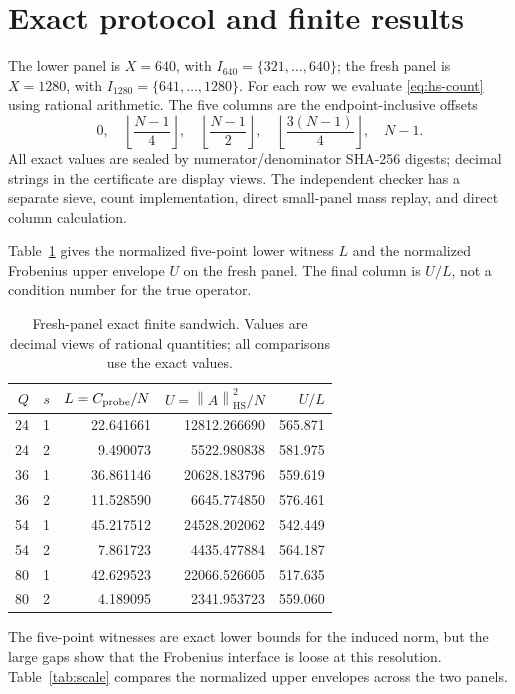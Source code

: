 \documentclass[10pt,a4paper]{article}
\newcommand{\HS}{\operatorname{HS}}
\newcommand{\norm}[1]{\left\lVert #1\right\rVert}
\begin{document}
\section{Exact protocol and finite results}

The lower panel is $X=640$, with $I_{640}=\{321,\ldots,640\}$; the fresh
panel is $X=1280$, with $I_{1280}=\{641,\ldots,1280\}$.  For each row we
evaluate \eqref{eq:hs-count} using rational arithmetic.  The five columns are
the endpoint-inclusive offsets
\[
 0,\quad \left\lfloor\frac{N-1}{4}\right\rfloor,\quad
 \left\lfloor\frac{N-1}{2}\right\rfloor,\quad
 \left\lfloor\frac{3(N-1)}{4}\right\rfloor,\quad N-1.
\]
All exact values are sealed by numerator/denominator SHA-256 digests; decimal
strings in the certificate are display views.  The independent checker has a
separate sieve, count implementation, direct small-panel mass replay, and
direct column calculation.

Table~\ref{tab:fresh} gives the normalized five-point lower witness $L$ and
the normalized Frobenius upper envelope $U$ on the fresh panel.  The final
column is $U/L$, not a condition number for the true operator.

\begin{table}[t]
\centering
\setlength{\tabcolsep}{5pt}
\small
\caption{Fresh-panel exact finite sandwich.  Values are decimal views of
 rational quantities; all comparisons use the exact values.}
\label{tab:fresh}
\begin{tabular}{rrr r r}
\toprule
$Q$ & $s$ & $L=C_{\rm probe}/N$ & $U=\norm{A}_{\HS}^2/N$ & $U/L$\\
\midrule
24&1&22.641661&12812.266690&565.871\\
24&2& 9.490073& 5522.980838&581.975\\
36&1&36.861146&20628.183796&559.619\\
36&2&11.528590& 6645.774850&576.461\\
54&1&45.217512&24528.202062&542.449\\
54&2& 7.861723& 4435.477884&564.187\\
80&1&42.629523&22066.526605&517.635\\
80&2& 4.189095& 2341.953723&559.060\\
\bottomrule
\end{tabular}
\end{table}

The five-point witnesses are exact lower bounds for the induced norm, but the
large gaps show that the Frobenius interface is loose at this resolution.
Table~\ref{tab:scale} compares the normalized upper envelopes across the two
panels.
\end{document}
